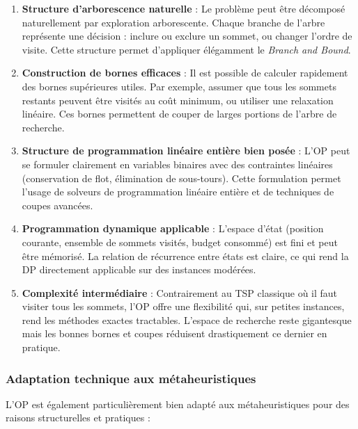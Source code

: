 \documentclass[11pt,a4paper]{article}
\begin{document}
\begin{enumerate}
    \item \textbf{Structure d'arborescence naturelle} : Le problème peut être décomposé naturellement par exploration arborescente. Chaque branche de l'arbre représente une décision : inclure ou exclure un sommet, ou changer l'ordre de visite. Cette structure permet d'appliquer élégamment le \emph{Branch and Bound}.
    
    \item \textbf{Construction de bornes efficaces} : Il est possible de calculer rapidement des bornes supérieures utiles. Par exemple, assumer que tous les sommets restants peuvent être visités au coût minimum, ou utiliser une relaxation linéaire. Ces bornes permettent de couper de larges portions de l'arbre de recherche.
    
    \item \textbf{Structure de programmation linéaire entière bien posée} : L'OP peut se formuler clairement en variables binaires avec des contraintes linéaires (conservation de flot, élimination de sous-tours). Cette formulation permet l'usage de solveurs de programmation linéaire entière et de techniques de coupes avancées.
    
    \item \textbf{Programmation dynamique applicable} : L'espace d'état (position courante, ensemble de sommets visités, budget consommé) est fini et peut être mémorisé. La relation de récurrence entre états est claire, ce qui rend la DP directement applicable sur des instances modérées.
    
    \item \textbf{Complexité intermédiaire} : Contrairement au TSP classique où il faut visiter tous les sommets, l'OP offre une flexibilité qui, sur petites instances, rend les méthodes exactes tractables. L'espace de recherche reste gigantesque mais les bonnes bornes et coupes réduisent drastiquement ce dernier en pratique.
\end{enumerate}

\subsubsection*{Adaptation technique aux métaheuristiques}

L'OP est également particulièrement bien adapté aux métaheuristiques pour des raisons structurelles et pratiques :
\end{document}

